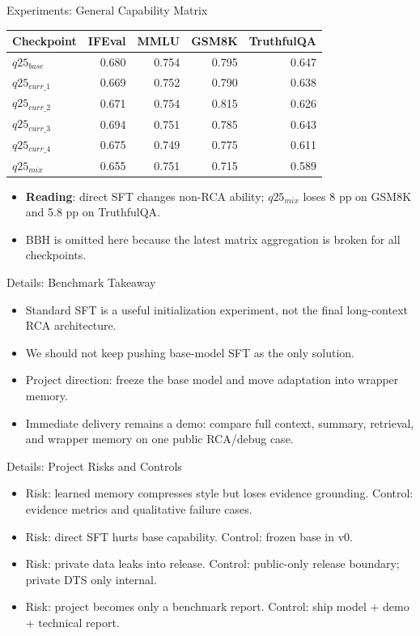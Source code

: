\begin{frame}{Experiments: General Capability Matrix}
  \tiny
  \begin{table}
    \begin{tabular}{lrrrr}
      \toprule
      Checkpoint & IFEval & MMLU & GSM8K & TruthfulQA \\
      \midrule
      $q25_{base}$ & 0.680 & 0.754 & 0.795 & 0.647 \\
      $q25_{curr\_1}$ & 0.669 & 0.752 & 0.790 & 0.638 \\
      $q25_{curr\_2}$ & 0.671 & 0.754 & 0.815 & 0.626 \\
      $q25_{curr\_3}$ & 0.694 & 0.751 & 0.785 & 0.643 \\
      $q25_{curr\_4}$ & 0.675 & 0.749 & 0.775 & 0.611 \\
      $q25_{mix}$ & 0.655 & 0.751 & 0.715 & 0.589 \\
      \bottomrule
    \end{tabular}
  \end{table}
  \normalsize
  \vspace{-0.4em}
  \begin{itemize}
    \item \textbf{Reading}: direct SFT changes non-RCA ability; $q25_{mix}$ loses 8 pp on GSM8K and 5.8 pp on TruthfulQA.
    \item BBH is omitted here because the latest matrix aggregation is broken for all checkpoints.
  \end{itemize}
\end{frame}

\begin{frame}{Details: Benchmark Takeaway}
  \begin{itemize}
    \item Standard SFT is a useful initialization experiment, not the final long-context RCA architecture.
    \item We should not keep pushing base-model SFT as the only solution.
    \item Project direction: freeze the base model and move adaptation into wrapper memory.
    \item Immediate delivery remains a demo: compare full context, summary, retrieval, and wrapper memory on one public RCA/debug case.
  \end{itemize}
\end{frame}

\begin{frame}{Details: Project Risks and Controls}
  \begin{itemize}
    \item Risk: learned memory compresses style but loses evidence grounding. Control: evidence metrics and qualitative failure cases.
    \item Risk: direct SFT hurts base capability. Control: frozen base in v0.
    \item Risk: private data leaks into release. Control: public-only release boundary; private DTS only internal.
    \item Risk: project becomes only a benchmark report. Control: ship model + demo + technical report.
  \end{itemize}
\end{frame}
